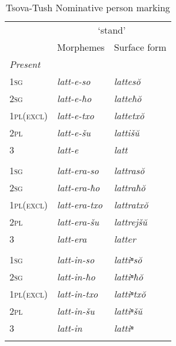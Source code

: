 \begin{table}
	\begin{tabular}{lll}
		\lsptoprule
		 & \multicolumn{2}{c}{`stand'}\\\cmidrule(lr){2-3}
		 & Morphemes & Surface form \\
	\midrule
		
		\multicolumn{3}{l}{\emph{Present}} \\
		
		\textsc{1sg} & \textit{latt-e-so} & \textit{lattes\u{o}} \\
		
		\textsc{2sg} & \textit{latt-e-ħo} & \textit{latteħ\u{o}} \\
		
		\textsc{1pl(excl)} & \textit{latt-e-txo} & \textit{lattetx\u{o}} \\
		
		\textsc{2pl} & \textit{latt-e-šu} & \textit{lattiš\u{u}} \\
		
		\textsc{3} & \textit{latt-e} & \textit{latt} \\\addlinespace
		
		\multicolumn{3}{l}{\emph{Imperfect}} \\
		
		\textsc{1sg} & \textit{latt-era-so} & \textit{lattras\u{o}} \\
		
		\textsc{2sg} & \textit{latt-era-ħo} & \textit{lattraħ\u{o}} \\
		
		\textsc{1pl(excl)} & \textit{latt-era-txo} & \textit{lattratx\u{o}} \\
		
		\textsc{2pl} & \textit{latt-era-šu} & \textit{lattrejš\u{u}} \\
		
		\textsc{3} & \textit{latt-era} & \textit{latter} \\\addlinespace
		
		\multicolumn{3}{l}{\emph{Aorist}} \\
		
		\textsc{1sg} & \textit{latt-in-so} & \textit{lattiⁿs\u{o}} \\
		
		\textsc{2sg} & \textit{latt-in-ħo} & \textit{lattiⁿħ\u{o}} \\
		
		\textsc{1pl(excl)} & \textit{latt-in-txo} & \textit{lattiⁿtx\u{o}} \\
		
		\textsc{2pl} & \textit{latt-in-šu} & \textit{lattiⁿš\u{u}} \\
		
		\textsc{3} & \textit{latt-in} & \textit{lattiⁿ} \\
		\lspbottomrule
		
		
	\end{tabular}
	\caption{Tsova-Tush Nominative person marking}
	\label{verbalperson-table2}
\end{table}

